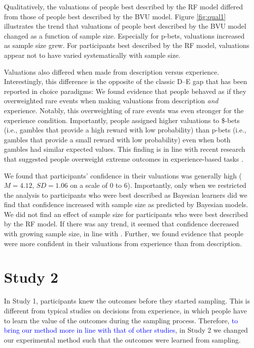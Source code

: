\documentclass[a4paper, man, natbib, floatsintext]{apa6} %
\begin{document}
Qualitatively, the valuations of people best described by the RF model differed from those of people best described by the BVU model. Figure \ref{fig:qual1} illustrates the trend that valuations of people best described by the BVU model changed as a function of sample size. Especially for p-bets, valuations increased as sample size grew. %
For participants best described by the RF model, valuations appear not to have varied systematically with sample size. 

Valuations also differed when made from description versus experience. Interestingly, this difference is the opposite of the classic D--E gap that has been reported in choice paradigms: We found evidence that people behaved as if they overweighted rare events when making valuations from description \textit{and} experience. Notably, this overweighting of rare events was even stronger for the experience condition. Importantly, people assigned higher valuations to \$-bets (i.e., gambles that provide a high reward with low probability) than p-bets (i.e., gambles that provide a small reward with low probability) even when both gambles had similar expected values. This finding is in line with recent research that suggested people overweight extreme outcomes in experience-based tasks \citep{Ludvig2017}.

We found that participants' confidence in their valuations was generally high ($M = 4.12$, $SD = 1.06$ on a scale of 0 to 6). Importantly, only when we restricted the analysis to participants who were best described as Bayesian learners did we find that confidence increased with sample size as predicted by Bayesian models. We did not find an effect of sample size for participants who were best described by the RF model. If there was any trend, it seemed that confidence decreased with growing sample size, in line with \cite{Griffin1992}. Further, we found evidence that people were more confident in their valuations from experience than from description. 


\section{Study 2}
In Study 1, participants knew the outcomes before they started sampling. This is different from typical studies on decisions from experience, in which people have to learn the value of the outcomes during the sampling process. Therefore, \textcolor{blue}{to bring our method more in line with that of other studies}, in Study 2 we changed our experimental method such that the outcomes were learned from sampling.
\end{document}
